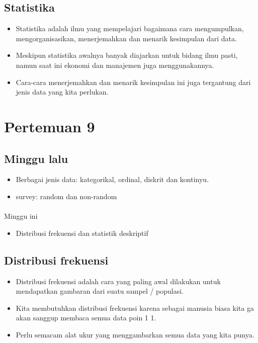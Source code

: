 \documentclass[
  letterpaper,
  DIV=11,
  numbers=noendperiod]{scrartcl}
\makeatletter
\let\oldparagraph\paragraph
\renewcommand{\paragraph}{
    \@ifstar
      \xxxParagraphStar
      \xxxParagraphNoStar
  }
\newcommand{\xxxParagraphStar}[1]{\oldparagraph*{#1}\mbox{}}
\newcommand{\xxxParagraphNoStar}[1]{\oldparagraph{#1}\mbox{}}
\providecommand{\tightlist}{%
  \setlength{\itemsep}{0pt}\setlength{\parskip}{0pt}}\usepackage{longtable,booktabs,array}
\makeatother
\begin{document}
\subsection{Statistika}\label{statistika}

\begin{itemize}
\item
  Statistika adalah ilmu yang mempelajari bagaimana cara mengumpulkan,
  mengorganisasikan, menerjemahkan dan menarik kesimpulan dari data.
\item
  Meskipun statistika awalnya banyak diajarkan untuk bidang ilmu pasti,
  namun saat ini ekonomi dan manajemen juga menggunakannya.
\item
  Cara-cara menerjemahkan dan menarik kesimpulan ini juga tergantung
  dari jenis data yang kita perlukan.
\end{itemize}

\section{Pertemuan 9}\label{pertemuan-9}

\subsection{Minggu lalu}\label{minggu-lalu-2}

\begin{itemize}
\item
  Berbagai jenis data: kategorikal, ordinal, diskrit dan kontinyu.
\item
  survey: random dan non-random
\end{itemize}

\paragraph{Minggu ini}\label{minggu-ini}

\begin{itemize}
\tightlist
\item
  Distribusi frekuensi dan statistik deskriptif
\end{itemize}

\subsection{Distribusi frekuensi}\label{distribusi-frekuensi}

\begin{itemize}
\item
  Distribusi frekuensi adalah cara yang paling awal dilakukan untuk
  mendapatkan gambaran dari suatu sampel / populasi.
\item
  Kita membutuhkan distribusi frekuensi karena sebagai manusia biasa
  kita ga akan sanggup membaca semua data poin 1 1.
\item
  Perlu semacam alat ukur yang menggambarkan semua data yang kita punya.
\end{itemize}
\end{document}

